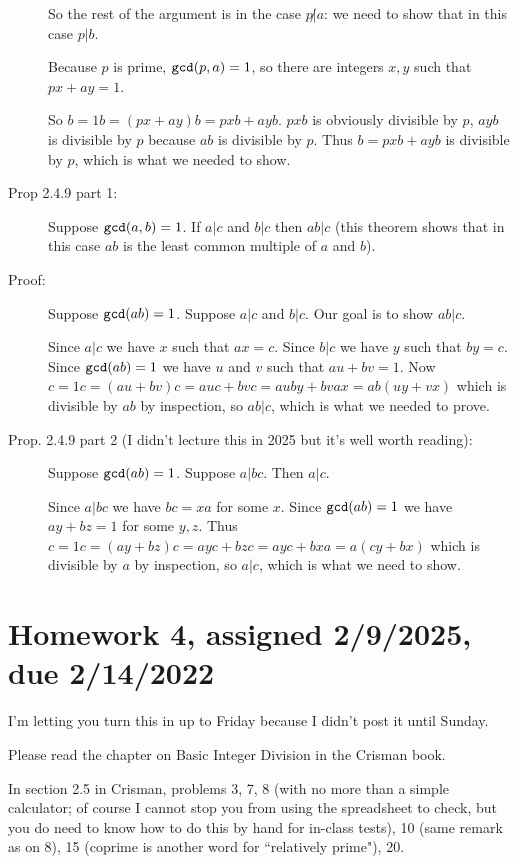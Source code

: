 \documentclass[12pt]{article}
\begin{document}
\begin{description}
So the rest of the argument is in the case $p\not|a$:  we need to show that in this case $p|b$.

Because $p$ is prime, ${\tt gcd}(p,a)=1$, so there are integers $x,y$ such that $px+ay=1$.

So $b=1b=(px+ay)b = pxb + ayb$.  $pxb$ is obviously divisible by $p$,  $ayb$ is divisible by $p$ because $ab$ is divisible by $p$.
Thus $b=pxb +ayb$ is divisible by $p$, which is what we needed to show.

\item[Prop 2.4.9 part 1:]  Suppose ${\tt gcd}(a,b) = 1$.  If $a|c$ and $b|c$ then $ab|c$ (this theorem shows that in this case $ab$ is the least common multiple of $a$ and $b$).

\item[Proof:]  Suppose ${\tt gcd}(ab) = 1$.  Suppose $a|c$ and $b|c$.  Our goal is to show $ab|c$.

Since $a|c$ we have $x$ such that $ax=c$.  Since $b|c$ we have $y$ such that $by=c$.  Since ${\tt gcd}(ab) = 1$ we have $u$ and $v$ such that $au+bv=1$.  Now $c=1c=(au+bv)c=auc + bvc= auby + bvax = ab(uy+vx)$ which is divisible by $ab$ by inspection, so $ab|c$, which is what we needed to prove.

\item[Prop. 2.4.9 part 2  (I didn't lecture this in 2025 but it's well worth reading):]  Suppose ${\tt gcd}(ab) = 1$.  Suppose $a|bc$.  Then $a|c$.

Since $a|bc$ we have $bc=xa$ for some $x$.  Since ${\tt gcd}(ab) = 1$ we have $ay+bz=1$ for some $y,z$.  Thus $c=1c = (ay+bz)c=ayc+bzc=ayc +bxa=a(cy+bx)$ which is divisible by $a$ by inspection, so $a|c$, which is what we need to show.

\end{description}



\newpage

\section{Homework 4, assigned 2/9/2025, due 2/14/2022}

I'm letting you turn this in up to Friday because I didn't post it until Sunday.

Please read the chapter on Basic Integer Division in the Crisman book.

In section 2.5 in Crisman, problems 3, 7, 8 (with no more than a simple calculator;  of course I cannot stop you from using the spreadsheet to check, but you do need to know how to do this by hand for in-class tests), 10 (same remark as on 8), 15 (coprime is another word for ``relatively prime"),  20.
\end{document}
